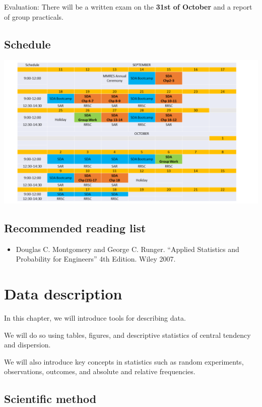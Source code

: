 \documentclass[
]{book}
\providecommand{\tightlist}{%
  \setlength{\itemsep}{0pt}\setlength{\parskip}{0pt}}
\begin{document}
Evaluation: There will be a written exam on the \textbf{31st of October} and a report of group practicals.

\hypertarget{schedule}{%
\section{Schedule}\label{schedule}}

\includegraphics{./figures/calendario.png}

\hypertarget{recommended-reading-list}{%
\section{Recommended reading list}\label{recommended-reading-list}}

\begin{itemize}
\tightlist
\item
  Douglas C. Montgomery and George C. Runger. ``Applied Statistics and Probability for Engineers'' 4th Edition. Wiley 2007.
\end{itemize}

\hypertarget{data-description}{%
\chapter{Data description}\label{data-description}}

In this chapter, we will introduce tools for describing data.

We will do so using tables, figures, and descriptive statistics of central tendency and dispersion.

We will also introduce key concepts in statistics such as random experiments, observations, outcomes, and absolute and relative frequencies.

\hypertarget{scientific-method}{%
\section{Scientific method}\label{scientific-method}}
\end{document}
